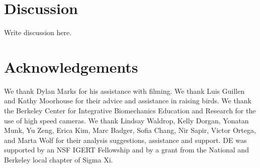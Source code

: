 \section{Discussion}
\label{sec:1discussion}
Write discussion here. 

%
%


\section{Acknowledgements}
We thank Dylan Marks for his assistance with filming.  We thank Luis Guillen and Kathy Moorhouse for their advice and assistance in raising birds.  We thank the Berkeley Center for Integrative Biomechanics Education and Research for the use of high speed cameras.  We thank Lindsay Waldrop, Kelly Dorgan, Yonatan Munk, Yu Zeng, Erica Kim, Marc Badger, Sofia Chang, Nir Sapir, Victor Ortega, and Marta Wolf for their analysis suggestions, assistance and support.  DE was supported by an NSF IGERT Fellowship and by a grant from the National and Berkeley local chapter of Sigma Xi.




